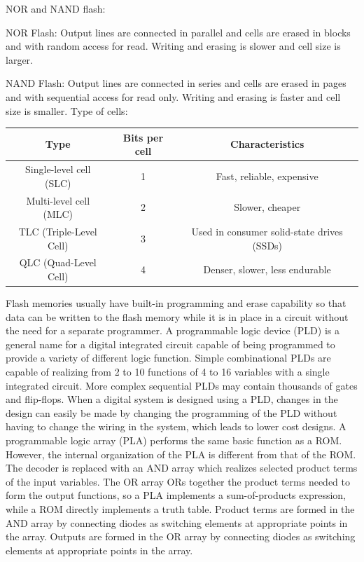 \documentclass[a4paper,12pt]{report}
\begin{document}
NOR and NAND flash:
\bit
\item NOR Flash: Output lines are connected in parallel and cells are erased in blocks and with random access for read. Writing and erasing is slower and cell size is larger.
\item NAND Flash: Output lines are connected in series and cells are erased in pages and with sequential access for read only. Writing and erasing is faster and cell size is smaller.
\eit
Type of cells:
\begin{longtable}[c]{|c|c|c|}
\hline
Type & Bits per cell & Characteristics \\\hline
Single-level cell (SLC) & 1 & Fast, reliable, expensive \\\hline
Multi-level cell (MLC) & 2 & Slower, cheaper \\\hline
TLC (Triple-Level Cell) & 3 & Used in consumer solid-state drives (SSDs) \\\hline
QLC (Quad-Level Cell) & 4 & Denser, slower, less endurable \\\hline
\end{longtable}
Flash memories usually have built-in programming and erase capability so that data can be written to the flash memory while it is in place in a circuit without the need for a separate programmer.
\eit
{}
A programmable logic device (PLD) is a general name for a digital integrated circuit capable of being programmed to provide a variety of different logic function. Simple combinational PLDs are capable of realizing from 2 to 10 functions of 4 to 16 variables with a single integrated circuit. More complex sequential PLDs may contain thousands of gates and flip-flops. When a digital system is designed using a PLD, changes in the design can easily be made by changing the programming of the PLD without having to change the wiring in the system, which leads to lower cost designs.
A programmable logic array (PLA) performs the same basic function as a ROM. However, the internal organization of the PLA is different from that of the ROM. The decoder is replaced with an AND array which realizes selected product terms of the input variables. The OR array ORs together the product terms needed to form the output functions, so a PLA implements a sum-of-products expression, while a ROM directly implements a truth table. Product terms are formed in the AND array by connecting diodes as switching elements at appropriate points in the array. Outputs are formed in the OR array by connecting diodes as switching elements at appropriate points in the array.
\end{document}

